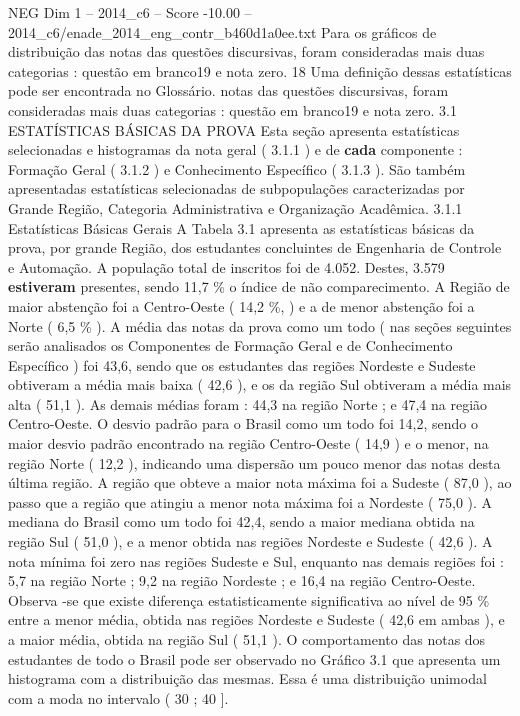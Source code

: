 \begin{textsample}{NEG Dim 1 – 2014\_c6 – Score -10.00 – 2014\_c6/enade\_2014\_eng\_contr\_b460d1a0ee.txt}
Para os gráficos de distribuição das notas das questões discursivas, foram consideradas mais duas categorias : questão em branco19 e nota zero. 18 Uma definição dessas estatísticas pode ser encontrada no Glossário. notas das questões discursivas, foram consideradas mais duas categorias : questão em branco19 e nota zero. 3.1 ESTATÍSTICAS BÁSICAS DA PROVA Esta seção apresenta estatísticas selecionadas e histogramas da nota geral ( 3.1.1 ) e de \textbf{cada} componente : Formação Geral ( 3.1.2 ) e Conhecimento Específico ( 3.1.3 ).
São também apresentadas estatísticas selecionadas de subpopulações caracterizadas por Grande Região, Categoria Administrativa e Organização Acadêmica. 3.1.1 Estatísticas Básicas Gerais A Tabela 3.1 apresenta as estatísticas básicas da prova, por grande Região, dos estudantes concluintes de Engenharia de Controle e Automação.
A população total de inscritos foi de 4.052.
Destes, 3.579 \textbf{estiveram} presentes, sendo 11,7 \% o índice de não comparecimento.
A Região de maior abstenção foi a Centro-Oeste ( 14,2 \%, ) e a de menor abstenção foi a Norte ( 6,5 \% ).
A média das notas da prova como um todo ( nas seções seguintes serão analisados os Componentes de Formação Geral e de Conhecimento Específico ) foi 43,6, sendo que os estudantes das regiões Nordeste e Sudeste obtiveram a média mais baixa ( 42,6 ), e os da região Sul obtiveram a média mais alta ( 51,1 ).
As demais médias foram : 44,3 na região Norte ; e 47,4 na região Centro-Oeste.
O desvio padrão para o Brasil como um todo foi 14,2, sendo o maior desvio padrão encontrado na região Centro-Oeste ( 14,9 ) e o menor, na região Norte ( 12,2 ), indicando uma dispersão um pouco menor das notas desta última região.
A região que obteve a maior nota máxima foi a Sudeste ( 87,0 ), ao passo que a região que atingiu a menor nota máxima foi a Nordeste ( 75,0 ).
A mediana do Brasil como um todo foi 42,4, sendo a maior mediana obtida na região Sul ( 51,0 ), e a menor obtida nas regiões Nordeste e Sudeste ( 42,6 ).
A nota mínima foi zero nas regiões Sudeste e Sul, enquanto nas demais regiões foi : 5,7 na região Norte ; 9,2 na região Nordeste ; e 16,4 na região Centro-Oeste.
Observa -se que existe diferença estatisticamente significativa ao nível de 95 \% entre a menor média, obtida nas regiões Nordeste e Sudeste ( 42,6 em ambas ), e a maior média, obtida na região Sul ( 51,1 ).
O comportamento das notas dos estudantes de todo o Brasil pode ser observado no Gráfico 3.1 que apresenta um histograma com a distribuição das mesmas.
Essa é uma distribuição unimodal com a moda no intervalo ( 30 ; 40 ].

\end{textsample}
